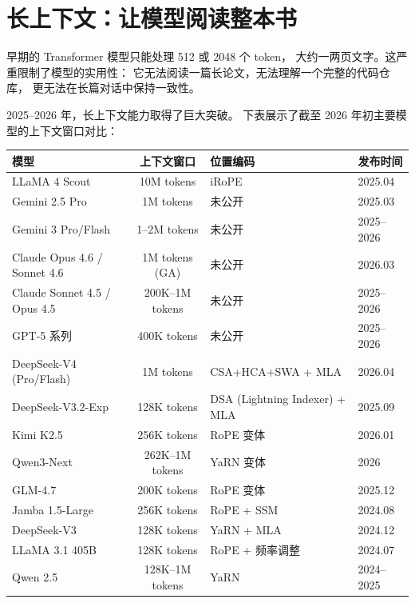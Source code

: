 \chapter{长上下文：让模型阅读整本书}
\label{ch:long-context}

早期的 Transformer 模型只能处理 512 或 2048 个 token，
大约一两页文字。这严重限制了模型的实用性：
它无法阅读一篇长论文，无法理解一个完整的代码仓库，
更无法在长篇对话中保持一致性。

2025--2026 年，长上下文能力取得了巨大突破。
下表展示了截至 2026 年初主要模型的上下文窗口对比：

\begin{center}\small
\renewcommand{\arraystretch}{1.3}
\begin{tabular}{lcll}
\toprule
\rowcolor{figLightGray}
\textbf{模型} & \textbf{上下文窗口} & \textbf{位置编码} & \textbf{发布时间} \\
\midrule
LLaMA 4 Scout     & 10M tokens  & iRoPE       & 2025.04 \\
Gemini 2.5 Pro    & 1M tokens   & 未公开       & 2025.03 \\
Gemini 3 Pro/Flash & 1--2M tokens & 未公开      & 2025--2026 \\
Claude Opus 4.6 / Sonnet 4.6 & 1M tokens (GA) & 未公开 & 2026.03 \\
Claude Sonnet 4.5 / Opus 4.5 & 200K--1M tokens & 未公开 & 2025--2026 \\
GPT-5 系列        & 400K tokens & 未公开       & 2025--2026 \\
DeepSeek-V4 (Pro/Flash) & 1M tokens & CSA+HCA+SWA + MLA & 2026.04 \\
DeepSeek-V3.2-Exp & 128K tokens & DSA (Lightning Indexer) + MLA & 2025.09 \\
Kimi K2.5          & 256K tokens & RoPE 变体    & 2026.01 \\
Qwen3-Next        & 262K--1M tokens & YaRN 变体 & 2026 \\
GLM-4.7           & 200K tokens & RoPE 变体    & 2025.12 \\
Jamba 1.5-Large   & 256K tokens & RoPE + SSM   & 2024.08 \\
DeepSeek-V3       & 128K tokens & YaRN + MLA   & 2024.12 \\
LLaMA 3.1 405B    & 128K tokens & RoPE + 频率调整 & 2024.07 \\
Qwen 2.5          & 128K--1M tokens & YaRN    & 2024--2025 \\
\bottomrule
\end{tabular}
\end{center}

